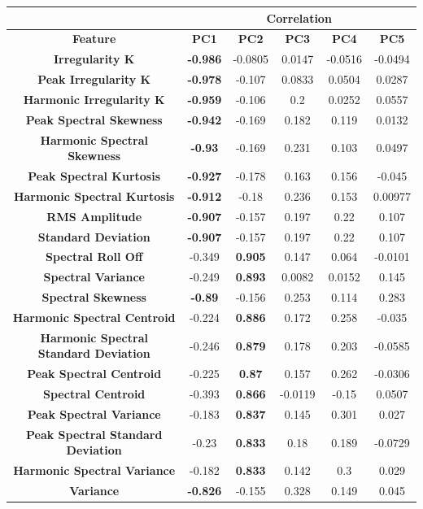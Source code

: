 		\begin{table}[h!]
			\centering
			\begin{tabular}{|c|c|c|c|c|c|}
				\cline{2-6}
				\multicolumn{1}{c}{} & \multicolumn{5}{|c|}{\bf{Correlation}} \tabularnewline
				\hline
				\bf{Feature} & \bf{PC1} & \bf{PC2} & \bf{PC3} & \bf{PC4} & \bf{PC5} \tabularnewline
				\hline
				\hline
				\bf{Irregularity K} & \bf{-0.986} & -0.0805 & 0.0147 & -0.0516 & -0.0494 \tabularnewline
				\hline
				\bf{Peak Irregularity K} & \bf{-0.978} & -0.107 & 0.0833 & 0.0504 & 0.0287 \tabularnewline
				\hline
				\bf{Harmonic Irregularity K} & \bf{-0.959} & -0.106 & 0.2 & 0.0252 & 0.0557 \tabularnewline
				\hline
				\bf{Peak Spectral Skewness} & \bf{-0.942} & -0.169 & 0.182 & 0.119 & 0.0132 \tabularnewline
				\hline
				\bf{Harmonic Spectral Skewness} & \bf{-0.93} & -0.169 & 0.231 & 0.103 & 0.0497 \tabularnewline
				\hline
				\bf{Peak Spectral Kurtosis} & \bf{-0.927} & -0.178 & 0.163 & 0.156 & -0.045 \tabularnewline
				\hline
				\bf{Harmonic Spectral Kurtosis} & \bf{-0.912} & -0.18 & 0.236 & 0.153 & 0.00977 \tabularnewline
				\hline
				\bf{RMS Amplitude} & \bf{-0.907} & -0.157 & 0.197 & 0.22 & 0.107 \tabularnewline
				\hline
				\bf{Standard Deviation} & \bf{-0.907} & -0.157 & 0.197 & 0.22 & 0.107 \tabularnewline
				\hline
				\bf{Spectral Roll Off} & -0.349 & \bf{0.905} & 0.147 & 0.064 & -0.0101 \tabularnewline
				\hline
				\bf{Spectral Variance} & -0.249 & \bf{0.893} & 0.0082 & 0.0152 & 0.145 \tabularnewline
				\hline
				\bf{Spectral Skewness} & \bf{-0.89} & -0.156 & 0.253 & 0.114 & 0.283 \tabularnewline
				\hline
				\bf{Harmonic Spectral Centroid} & -0.224 & \bf{0.886} & 0.172 & 0.258 & -0.035 \tabularnewline
				\hline
				\bf{Harmonic Spectral Standard Deviation} & -0.246 & \bf{0.879} & 0.178 & 0.203 & -0.0585 \tabularnewline
				\hline
				\bf{Peak Spectral Centroid} & -0.225 & \bf{0.87} & 0.157 & 0.262 & -0.0306 \tabularnewline
				\hline
				\bf{Spectral Centroid} & -0.393 & \bf{0.866} & -0.0119 & -0.15 & 0.0507 \tabularnewline
				\hline
				\bf{Peak Spectral Variance} & -0.183 & \bf{0.837} & 0.145 & 0.301 & 0.027 \tabularnewline
				\hline
				\bf{Peak Spectral Standard Deviation} & -0.23 & \bf{0.833} & 0.18 & 0.189 & -0.0729 \tabularnewline
				\hline
				\bf{Harmonic Spectral Variance} & -0.182 & \bf{0.833} & 0.142 & 0.3 & 0.029 \tabularnewline
				\hline
				\bf{Variance} & \bf{-0.826} & -0.155 & 0.328 & 0.149 & 0.045 \tabularnewline
				\hline
			\end{tabular}
		\end{table}

